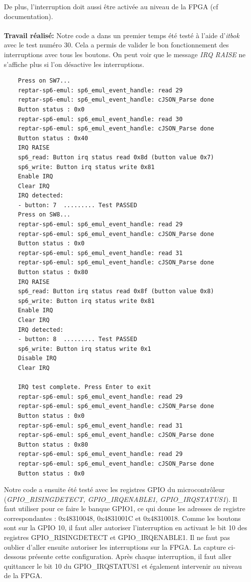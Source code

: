 De plus, l'interruption doit aussi être activée au niveau de la FPGA (cf documentation). \\\\
\textbf{Travail réalisé: }Notre code a dans un premier temps été testé à l'aide d'\textit{itbok} avec le test numéro 30. Cela a permis de valider le bon fonctionnement des interruptions avec tous les boutons. On peut voir que le message \textit{IRQ RAISE} ne s'affiche plus si l'on désactive les interruptions.
\begin{lstlisting}
	Press on SW7...
	reptar-sp6-emul: sp6_emul_event_handle: read 29 
	reptar-sp6-emul: sp6_emul_event_handle: cJSON_Parse done 
	Button status : 0x0
	reptar-sp6-emul: sp6_emul_event_handle: read 30 
	reptar-sp6-emul: sp6_emul_event_handle: cJSON_Parse done 
	Button status : 0x40
	IRQ RAISE
	sp6_read: Button irq status read 0x8d (button value 0x7)
	sp6_write: Button irq status write 0x81
	Enable IRQ
	Clear IRQ
	IRQ detected:
	- button: 7  ......... Test PASSED
	Press on SW8...
	reptar-sp6-emul: sp6_emul_event_handle: read 29 
	reptar-sp6-emul: sp6_emul_event_handle: cJSON_Parse done 
	Button status : 0x0
	reptar-sp6-emul: sp6_emul_event_handle: read 31 
	reptar-sp6-emul: sp6_emul_event_handle: cJSON_Parse done 
	Button status : 0x80
	IRQ RAISE
	sp6_read: Button irq status read 0x8f (button value 0x8)
	sp6_write: Button irq status write 0x81
	Enable IRQ
	Clear IRQ
	IRQ detected:
	- button: 8  ......... Test PASSED
	sp6_write: Button irq status write 0x1
	Disable IRQ
	Clear IRQ
	
	IRQ test complete. Press Enter to exit
	reptar-sp6-emul: sp6_emul_event_handle: read 29 
	reptar-sp6-emul: sp6_emul_event_handle: cJSON_Parse done 
	Button status : 0x0
	reptar-sp6-emul: sp6_emul_event_handle: read 31 
	reptar-sp6-emul: sp6_emul_event_handle: cJSON_Parse done 
	Button status : 0x80
	reptar-sp6-emul: sp6_emul_event_handle: read 29 
	reptar-sp6-emul: sp6_emul_event_handle: cJSON_Parse done 
	Button status : 0x0
\end{lstlisting}
Notre code a ensuite été testé avec les registres GPIO du microcontrôleur (\textit{GPIO\_RISINGDETECT, GPIO\_IRQENABLE1, GPIO\_IRQSTATUS1}). Il faut utiliser pour ce faire le banque GPIO1, ce qui donne les adresses de registre correspondantes : 0x48310048, 0x4831001C et 0x48310018. Comme les boutons sont sur la GPIO 10, il faut aller autoriser l'interruption en activant le bit 10 des registres GPIO\_RISINGDETECT et  GPIO\_IRQENABLE1. Il ne faut pas oublier d'aller ensuite autoriser les interruptions sur la FPGA. La capture ci-dessous présente cette configuration. Après chaque interruption, il faut aller quittancer le bit 10 du GPIO\_IRQSTATUS1 et également intervenir au niveau de la FPGA.
